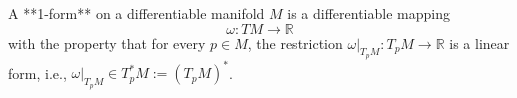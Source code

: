 A **1-form** on a differentiable manifold $M$ is a differentiable mapping
$$\omega: TM \to \mathbb{R}$$
with the property that for every $p \in M$, the restriction $\omega|_{T_pM}: T_pM \to \mathbb{R}$ is a linear form, i.e., $\omega|_{T_pM} \in T_p^*M := (T_pM)^*$.
